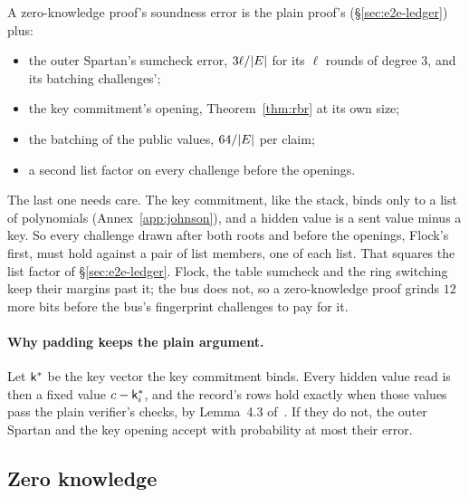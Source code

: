 A zero-knowledge proof's soundness error is the plain proof's (\S\ref{sec:e2e-ledger}) plus:
\begin{itemize}[itemsep=1pt,topsep=2pt]
\item the outer Spartan's sumcheck error, $3 \ell / |E|$ for its $\ell$ rounds of degree $3$, and its batching challenges';
\item the key commitment's opening, Theorem~\ref{thm:rbr} at its own size;
\item the batching of the public values, $64 / |E|$ per claim;
\item a second list factor on every challenge before the openings.
\end{itemize}
The last one needs care. The key commitment, like the stack, binds only to a list of polynomials (Annex~\ref{app:johnson}), and a hidden value is a sent value minus a key. So every challenge drawn after both roots and before the openings, Flock's first, must hold against a pair of list members, one of each list. That squares the list factor of \S\ref{sec:e2e-ledger}. Flock, the table sumcheck and the ring switching keep their margins past it; the bus does not, so a zero-knowledge proof grinds $12$ more bits before the bus's fingerprint challenges to pay for it.

\paragraph{Why padding keeps the plain argument.} Let $\mathsf{k}^\ast$ be the key vector the key commitment binds. Every hidden value read is then a fixed value $c - \mathsf{k}_i^\ast$, and the record's rows hold exactly when those values pass the plain verifier's checks, by Lemma~4.3 of~\cite{DHRR26}. If they do not, the outer Spartan and the key opening accept with probability at most their error.

\subsection{Zero knowledge}\label{zk:zk}

